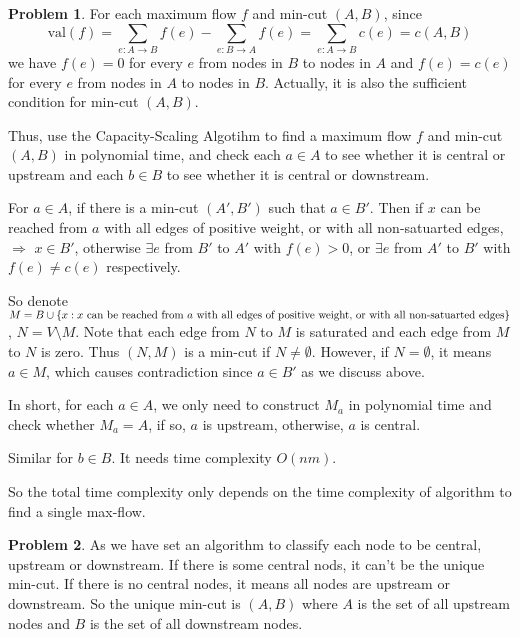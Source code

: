 \documentclass[a4paper]{article}
\theoremstyle{definition}
\newtheorem{problem}{Problem}
\theoremstyle{plain}
\numberwithin{equation}{problem}
\begin{document}
\begin{problem}
    For each maximum flow  $ f  $ and min-cut  $ (A,B) $, since 
    \[\mathrm{val}(f)=\sum_{e:A\to B}f(e)-\sum_{e:B\to A}f(e)=\sum_{e:A\to B}c(e)=c(A,B)\]
    we have  $ f(e)=0 $ for every  $ e $ from nodes in  $ B $ to nodes in  $ A $ and  $ f(e)=c(e) $ for every $ e $ from nodes in  $ A $ to nodes in  $ B $. Actually, it is also the sufficient condition for min-cut  $ (A,B) $. 
    
    Thus, use the Capacity-Scaling Algotihm to find a maximum flow $ f $ and min-cut $ (A,B) $  in polynomial time, and check each  $ a\in A $ to see whether it is central or upstream and each  $ b\in B $ to see whether it is central or downstream. 

    For  $ a\in A $, if there is a min-cut $ (A',B') $ such that  $ a\in B' $. Then if  $ x $ can be reached from  $ a  $ with all edges of positive weight, or with all non-satuarted edges,   $ \Rightarrow $  $ x\in B' $,  otherwise  $ \exists e $ from  $ B'  $ to  $ A' $ with  $ f(e)>0 $, or  $ \exists e $ from  $ A'  $ to  $ B' $ with  $ f(e)\neq c(e) $ respectively.


    So denote  $ M=B\cup \{x:x\text{ can be reached from  $ a $  with all edges of positive weight, or with all non-satuarted edges}\} $,  $ N=V\setminus M $. Note that  each edge from  $ N $ to  $ M $ is saturated and each edge from  $ M $ to  $ N $ is zero. Thus  $ (N,M) $ is a min-cut if  $ N\neq \emptyset $. However, if  $ N=\emptyset $, it means  $ a\in M $, which causes contradiction since  $ a\in B' $ as we discuss above.
    
    In short, for each  $ a\in A $, we only need to construct  $ M_a $ in polynomial time and check whether  $ M_a=A $, if so,  $ a $ is upstream, otherwise,  $ a $ is central.
    
    Similar for  $ b\in B $. It needs time complexity  $ O(nm) $.
    
    So the total time complexity only depends on the time complexity of algorithm to find a single max-flow.
\end{problem}
\begin{problem}
    As we have set an algorithm to classify each node to be central, upstream or downstream. If there is some central nods, it can't be the unique min-cut. If there is no central nodes, it means all nodes are upstream or downstream. So the unique min-cut is  $ (A,B)  $ where $ A $ is the set of all upstream nodes and  $ B $ is the set of all downstream nodes.
\end{problem}
\end{document}

